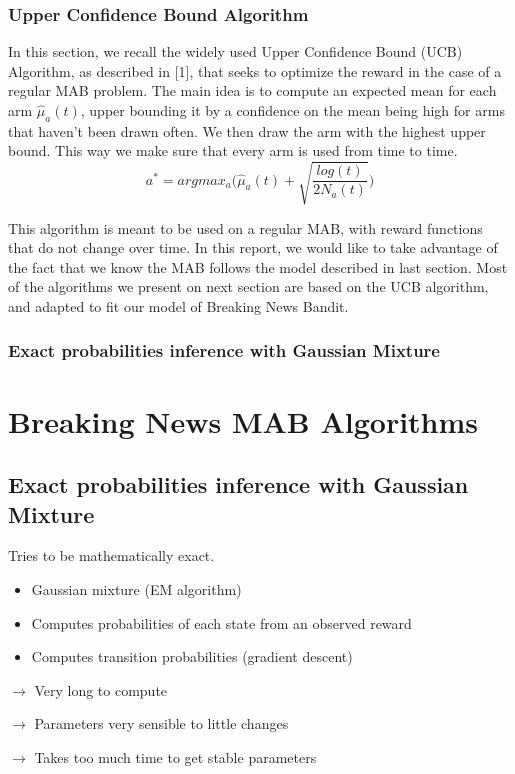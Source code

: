 \documentclass[french]{beamer}
\begin{document}
\begin{frame}
	\frametitle{Upper Confidence Bound Algorithm}
	
	In this section, we recall the widely used Upper Confidence Bound (UCB) Algorithm,
	as described in [1],
	that seeks to optimize the reward in the case of a regular MAB problem. The main
	idea is to compute an expected mean for each arm $\hat\mu_a(t)$, upper bounding it
	by a confidence on the mean being high for arms that haven't been drawn often. We
	then draw the arm with the highest upper bound.
	This way we make sure that every arm is used from time to time.
	\begin{equation*}
	a^* = argmax_{a} \Big(\hat\mu_a(t) + \sqrt{\frac{log(t)}{2N_a(t)}}\Big)
	\end{equation*}

	
	This algorithm is meant to be used on a regular MAB, with reward functions that do not
	change over time. In this report, we would like to take advantage of the fact that
	we know the MAB follows the model described in last section. Most of the algorithms
	we present on next section are based on the UCB algorithm, and adapted to fit our model
	of Breaking News Bandit.

	
\end{frame}

\begin{frame}
	\frametitle{Exact probabilities inference with Gaussian Mixture}
	\section{Breaking News MAB Algorithms}
	\subsection{Exact probabilities inference with Gaussian Mixture}
	
	Tries to be mathematically exact.
	\begin{itemize}
		\item Gaussian mixture (EM algorithm)
		\item Computes probabilities of each state from an observed reward
		\item Computes transition probabilities (gradient descent)
	\newline
	\end{itemize}
	
	$\rightarrow$ Very long to compute
	
	$\rightarrow$ Parameters very sensible to little changes
	
	$\rightarrow$ Takes too much time to get stable parameters
	
\end{frame}
\end{document}
